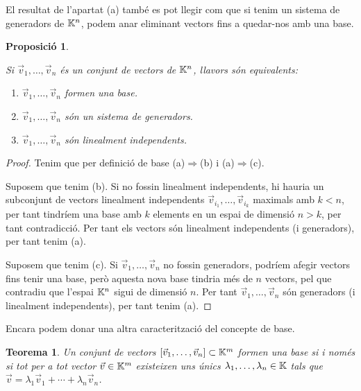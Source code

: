 \documentclass[
  11pt,
]{book}
\numberwithin{dummy}{section}
\theoremstyle{maincolornumbox}
\newtheorem{theorem}{TTTT}[chapter]
\newtheorem{theoremeT}{Teorema}[chapter]
\theoremstyle{blacknumex}
\theoremstyle{blacknumbox}
\theoremstyle{maincolornum}
\newtheorem{propositionT}{Proposició}[chapter]
\renewenvironment{theorem}{\begin{tBox}\begin{theoremeT}}{\end{theoremeT}\end{tBox}}
\newenvironment{proposition}{\begin{pBox}\begin{propositionT}}{\end{propositionT}\end{pBox}}
\newlength\esp
\begin{document}
El resultat de l'apartat (a) també es pot llegir com que si tenim un
sistema de generadors de \(\mathbb{K}^n\), podem anar eliminant vectors fins a
quedar-nos amb una base.

\begin{proposition}
\protect\hypertarget{prp:base-li-gen}{}\label{prp:base-li-gen}

Si
\(\vec v_1, \dots, \vec v_n\) és un conjunt de vectors de \(\mathbb{K}^n\), llavors
són equivalents:

\begin{enumerate}
\def\labelenumi{\arabic{enumi}.}
\item
  \(\vec v_1, \dots, \vec v_n\) formen una base.
\item
  \(\vec v_1, \dots, \vec v_n\) són un sistema de generadors.
\item
  \(\vec v_1, \dots, \vec v_n\) són linealment independents.
\end{enumerate}

\end{proposition}

\begin{proof}
Tenim que per definició de base (a)\(\Rightarrow\)(b) i
(a)\(\Rightarrow\)(c).

Suposem que tenim (b). Si no fossin linealment independents, hi hauria
un subconjunt de vectors linealment independents
\(\vec v_{i_1}, \dots, \vec v_{i_k}\) maximals amb \(k<n\), per tant
tindríem una base amb \(k\) elements en un espai de dimensió \(n>k\), per
tant contradicció. Per tant els vectors són linealment independents (i
generadors), per tant tenim (a).

Suposem que tenim (c). Si \(\vec v_1, \dots, \vec v_n\) no fossin
generadors, podríem afegir vectors fins tenir una base, però aquesta
nova base tindria més de \(n\) vectors, pel que contradiu que l'espai
\(\mathbb{K}^n\) sigui de dimensió \(n\). Per tant \(\vec v_1, \dots, \vec v_n\) són
generadors (i linealment independents), per tant tenim (a).
\end{proof}

Encara podem donar una altra caracterització del concepte de base.

\begin{theorem}
\protect\hypertarget{thm:base-coord-uniq}{}\label{thm:base-coord-uniq}Un conjunt de
vectors \([\vec v_1, \dots, \vec v_n] \subset \mathbb{K}^m\) formen una base si i
només si tot per a tot vector \(\vec v\in \mathbb{K}^m\) existeixen uns únics
\(\lambda_1, \dots, \lambda_n\in\mathbb{K}\) tals que
\(\vec v=\lambda_1\vec v_1+\cdots + \lambda_n\vec v_n\).
\end{theorem}
\end{document}
